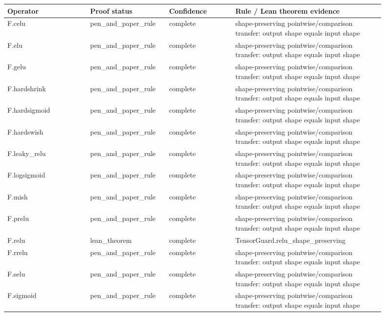 \documentclass[10pt]{article}
\begin{document}
\begin{longtable}{|p{0.20\linewidth}|p{0.18\linewidth}|p{0.16\linewidth}|p{0.36\linewidth}|}
\hline
\textbf{Operator} & \textbf{Proof status} & \textbf{Confidence} & \textbf{Rule / Lean theorem evidence} \\
\hline
F.celu & pen\_and\_paper\_rule & complete & shape-preserving pointwise/comparison transfer: output shape equals input shape \\
\hline
F.elu & pen\_and\_paper\_rule & complete & shape-preserving pointwise/comparison transfer: output shape equals input shape \\
\hline
F.gelu & pen\_and\_paper\_rule & complete & shape-preserving pointwise/comparison transfer: output shape equals input shape \\
\hline
F.hardshrink & pen\_and\_paper\_rule & complete & shape-preserving pointwise/comparison transfer: output shape equals input shape \\
\hline
F.hardsigmoid & pen\_and\_paper\_rule & complete & shape-preserving pointwise/comparison transfer: output shape equals input shape \\
\hline
F.hardswish & pen\_and\_paper\_rule & complete & shape-preserving pointwise/comparison transfer: output shape equals input shape \\
\hline
F.leaky\_relu & pen\_and\_paper\_rule & complete & shape-preserving pointwise/comparison transfer: output shape equals input shape \\
\hline
F.logsigmoid & pen\_and\_paper\_rule & complete & shape-preserving pointwise/comparison transfer: output shape equals input shape \\
\hline
F.mish & pen\_and\_paper\_rule & complete & shape-preserving pointwise/comparison transfer: output shape equals input shape \\
\hline
F.prelu & pen\_and\_paper\_rule & complete & shape-preserving pointwise/comparison transfer: output shape equals input shape \\
\hline
F.relu & lean\_theorem & complete & TensorGuard.relu\_shape\_preserving \\
\hline
F.rrelu & pen\_and\_paper\_rule & complete & shape-preserving pointwise/comparison transfer: output shape equals input shape \\
\hline
F.selu & pen\_and\_paper\_rule & complete & shape-preserving pointwise/comparison transfer: output shape equals input shape \\
\hline
F.sigmoid & pen\_and\_paper\_rule & complete & shape-preserving pointwise/comparison transfer: output shape equals input shape \\

\end{longtable}
\end{document}
